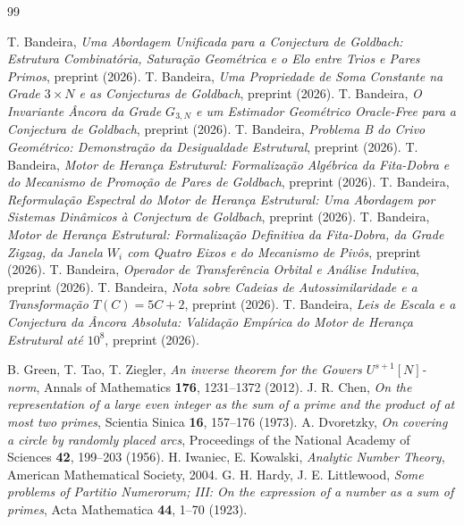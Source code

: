 \documentclass[11pt]{article}
\theoremstyle{definition}
\begin{document}
	
	\begin{thebibliography}{99}
		
		 T. Bandeira, \emph{Uma Abordagem Unificada para a Conjectura de Goldbach: Estrutura Combinatória, Saturação Geométrica e o Elo entre Trios e Pares Primos}, preprint (2026).
		 T. Bandeira, \emph{Uma Propriedade de Soma Constante na Grade $3\times N$ e as Conjecturas de Goldbach}, preprint (2026).
		 T. Bandeira, \emph{O Invariante Âncora da Grade $G_{3,N}$ e um Estimador Geométrico Oracle-Free para a Conjectura de Goldbach}, preprint (2026).
		 T. Bandeira, \emph{Problema B do Crivo Geométrico: Demonstração da Desigualdade Estrutural}, preprint (2026).
		 T. Bandeira, \emph{Motor de Herança Estrutural: Formalização Algébrica da Fita-Dobra e do Mecanismo de Promoção de Pares de Goldbach}, preprint (2026).
		 T. Bandeira, \emph{Reformulação Espectral do Motor de Herança Estrutural: Uma Abordagem por Sistemas Dinâmicos à Conjectura de Goldbach}, preprint (2026).
		 T. Bandeira, \emph{Motor de Herança Estrutural: Formalização Definitiva da Fita-Dobra, da Grade Zigzag, da Janela $W_i$ com Quatro Eixos e do Mecanismo de Pivôs}, preprint (2026).
		 T. Bandeira, \emph{Operador de Transferência Orbital e Análise Indutiva}, preprint (2026).
		 T. Bandeira, \emph{Nota sobre Cadeias de Autossimilaridade e a Transformação $T(C)=5C+2$}, preprint (2026).
		 T. Bandeira, \emph{Leis de Escala e a Conjectura da Âncora Absoluta: Validação Empírica do Motor de Herança Estrutural até $10^8$}, preprint (2026).
		
		 B. Green, T. Tao, T. Ziegler, \emph{An inverse theorem for the Gowers $U^{s+1}[N]$-norm}, Annals of Mathematics \textbf{176}, 1231--1372 (2012).
		 J. R. Chen, \emph{On the representation of a large even integer as the sum of a prime and the product of at most two primes}, Scientia Sinica \textbf{16}, 157--176 (1973).
		 A. Dvoretzky, \emph{On covering a circle by randomly placed arcs}, Proceedings of the National Academy of Sciences \textbf{42}, 199--203 (1956).
		 H. Iwaniec, E. Kowalski, \emph{Analytic Number Theory}, American Mathematical Society, 2004.
		 G. H. Hardy, J. E. Littlewood, \emph{Some problems of Partitio Numerorum; III: On the expression of a number as a sum of primes}, Acta Mathematica \textbf{44}, 1--70 (1923).
		
	\end{thebibliography}
	
\end{document}
